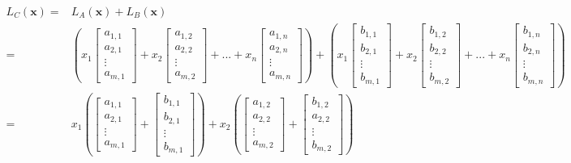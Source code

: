 \documentclass{article}
\begin{document}
\begin{align*}
L_C(\mathbf{x}) = & L_A(\mathbf{x}) + L_B(\mathbf{x}) \\
= & \left(x_1\begin{bmatrix} a_{1,1} \\ a_{2,1} \\ \vdots \\ a_{m,1} \end{bmatrix}
+ x_2\begin{bmatrix} a_{1,2} \\ a_{2,2} \\ \vdots \\ a_{m,2} \end{bmatrix}
+ ... + x_n\begin{bmatrix} a_{1,n} \\ a_{2,n} \\ \vdots \\ a_{m,n} \end{bmatrix}\right) + \left( 
x_1\begin{bmatrix} b_{1,1} \\ b_{2,1} \\ \vdots \\ b_{m,1} \end{bmatrix} 
+ x_2\begin{bmatrix} b_{1,2} \\ b_{2,2} \\ \vdots \\ b_{m,2} \end{bmatrix} 
+ ... + x_n\begin{bmatrix} b_{1,n} \\ b_{2,n} \\ \vdots \\ b_{m,n} \end{bmatrix}\right) \\
= & x_1\left(\begin{bmatrix} a_{1,1} \\ a_{2,1} \\ \vdots \\ a_{m,1} \end{bmatrix} + \begin{bmatrix} b_{1,1} \\ b_{2,1} \\ \vdots \\ b_{m,1} \end{bmatrix}\right)
+ x_2\left(\begin{bmatrix} a_{1,2} \\ a_{2,2} \\ \vdots \\ a_{m,2} \end{bmatrix} + \begin{bmatrix} b_{1,2} \\ a_{2,2} \\ \vdots \\ b_{m,2} \end{bmatrix}\right)

\end{align*}
\end{document}
